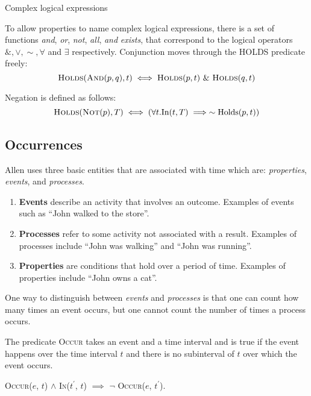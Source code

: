\begin{exmp} Complex logical expressions

	To allow properties to name complex logical expressions, there is a set of
	functions \textit{and}, \textit{or}, \textit{not}, \textit{all}, \textit{and} \textit{exists}, that correspond to the logical operators
	$\&, \lor, \sim, \forall$ and $\exists$ respectively.
	Conjunction moves through the HOLDS predicate freely:
	\begin{equation}
		\textsc{Holds}(\textsc{And}(p, q), t) \iff \textsc{Holds}(p, t) \  \& \  \textsc{Holds}(q, t)
	\end{equation}

	Negation is defined as follows:
	\begin{equation}
		\textsc{Holds}(\textsc{Not}(p), T) \iff (\forall t.\text{In}(t, T) \implies \sim \text{Holds}(p, t))
	\end{equation}
\end{exmp}




\subsection{Occurrences}
Allen uses three basic entities that are associated with time which are: \textit{properties}, \textit{events}, and \textit{processes}.
\begin{enumerate}
	\item \textbf{Events} describe an activity that involves an outcome. Examples of events such as ``John walked to the store''.

	\item \textbf{Processes} refer to some activity not associated with a result. Examples of processes include ``John was walking'' and ``John was running''.

	\item \textbf{Properties} are conditions that hold over a period of time. Examples of properties include ``John owns a cat''.
\end{enumerate}
One way to distinguish between \textit{events} and \textit{processes} is that one can count how many times an event occurs, but one cannot count
the number of times a process occurs.


The predicate \textsc{Occur} takes an event and a time interval and is true if the event happens over the time interval $t$ and there is no subinterval of $t$
over which the event occurs.

\begin{center}
	\textsc{Occur}($e$, $t$) $\land$ \textsc{In}($t^\prime$, $t$) $\implies$ \(\lnot\) \textsc{Occur}($e$, $t^\prime$).
\end{center}

